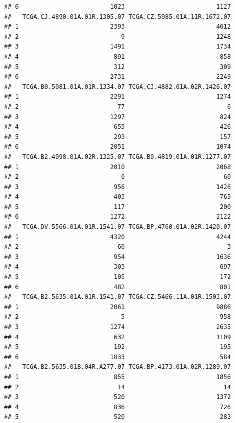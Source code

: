 \documentclass[
]{article}
\begin{document}
\begin{verbatim}
## 6                         1023                         1127
##   TCGA.CJ.4890.01A.01R.1305.07 TCGA.CZ.5985.01A.11R.1672.07
## 1                         2393                         4612
## 2                            9                         1248
## 3                         1491                         1734
## 4                          891                          858
## 5                          312                          309
## 6                         2731                         2249
##   TCGA.B0.5081.01A.01R.1334.07 TCGA.CJ.4882.01A.02R.1426.07
## 1                         2291                         1274
## 2                           77                            6
## 3                         1297                          824
## 4                          655                          426
## 5                          293                          157
## 6                         2051                         1074
##   TCGA.B2.4098.01A.02R.1325.07 TCGA.B0.4819.01A.01R.1277.07
## 1                         2010                         2068
## 2                            0                           60
## 3                          956                         1426
## 4                          403                          765
## 5                          117                          200
## 6                         1272                         2122
##   TCGA.DV.5566.01A.01R.1541.07 TCGA.BP.4760.01A.02R.1420.07
## 1                         4320                         4244
## 2                           60                            3
## 3                          954                         1636
## 4                          303                          697
## 5                          105                          172
## 6                          482                          801
##   TCGA.B2.5635.01A.01R.1541.07 TCGA.CZ.5466.11A.01R.1503.07
## 1                         2061                         9886
## 2                            5                          958
## 3                         1274                         2635
## 4                          632                         1109
## 5                          192                          195
## 6                         1833                          584
##   TCGA.B2.5635.01B.04R.A277.07 TCGA.BP.4173.01A.02R.1289.07
## 1                          855                         1856
## 2                           14                           14
## 3                          520                         1372
## 4                          836                          726
## 5                          520                          283

\end{verbatim}
\end{document}
